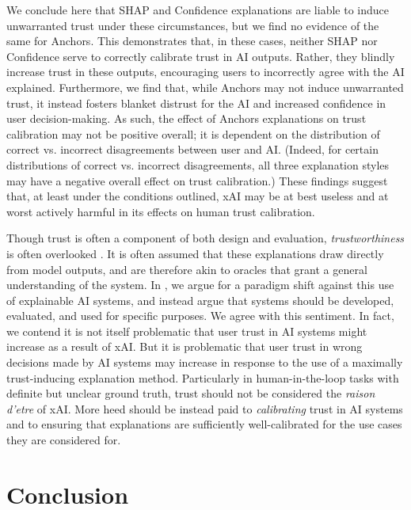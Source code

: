 We conclude here that SHAP and Confidence explanations are liable to induce unwarranted trust under these circumstances, but we find no evidence of the same for Anchors. This demonstrates that, in these cases, neither SHAP nor Confidence serve to correctly calibrate trust in AI outputs. Rather, they blindly increase trust in these outputs, encouraging users to incorrectly agree with the AI explained. Furthermore, we find that, while Anchors may not induce unwarranted trust, it instead fosters blanket distrust for the AI and increased confidence in user decision-making. As such, the effect of Anchors explanations on trust calibration may not be positive overall; it is dependent on the distribution of correct vs. incorrect disagreements between user and AI. (Indeed, for certain distributions of correct vs. incorrect disagreements, all three explanation styles may have a negative overall effect on trust calibration.) These findings suggest that, at least under the conditions outlined, xAI may be at best useless and at worst actively harmful in its effects on human trust calibration. 

Though trust is often a component of both design and evaluation, \emph{trustworthiness} is often overlooked \cite{jacovi_formalizing_2021,lundberg_unified_2017,ribeiro_why_2016,jacobs_how_2021}. It is often assumed that these explanations draw directly from model outputs, and are therefore akin to oracles that grant a general understanding of the system. In \textcite{natarajan_trust_2023}, we argue for a paradigm shift against this use of explainable AI systems, and instead argue that systems should be developed, evaluated, and used for specific purposes. We agree with this sentiment. In fact, we contend it is not itself problematic that user trust in AI systems might increase as a result of xAI. But it is problematic that user trust in wrong decisions made by AI systems may increase in response to the use of a maximally trust-inducing explanation method. Particularly in human-in-the-loop tasks with definite but unclear ground truth, trust should not be considered the \emph{raison d'etre} of xAI. More heed should be instead paid to \emph{calibrating} trust in AI systems and to ensuring that explanations are sufficiently well-calibrated for the use cases they are considered for.

\section{Conclusion}

